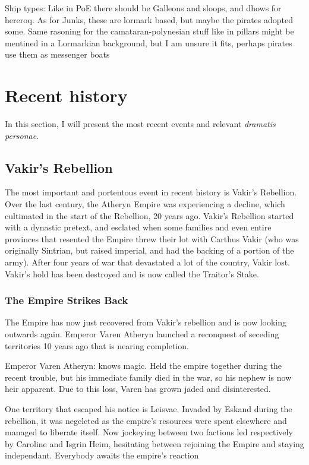 Ship types:
	Like in PoE there should be Galleons and sloops, and dhows for hereroq.
	As for Junks, these are lormark based, but maybe the pirates adopted some. Same rasoning for the camataran-polynesian stuff like in pillars might be mentined in a Lormarkian background, but I am unsure it fits, perhaps pirates use them as messenger boats


\section{Recent history}

\label{recent_history}

In this section, I will present the most recent events and relevant \textit{dramatis personae}.

\subsection{Vakir's Rebellion}

The most important and portentous event in recent history is Vakir's Rebellion. Over the last century, the Atheryn Empire was experiencing a decline, which cultimated in the start of the Rebellion, 20 years ago. Vakir's Rebellion started with a dynastic pretext, and esclated when some families and even entire provinces that resented the Empire threw their lot with Carthus Vakir (who was originally Sintrian, but raised imperial, and had the backing of a portion of the army). After four years of war that devastated a lot of the country, Vakir lost. Vakir's hold has been destroyed and is now called the Traitor's Stake.


\subsubsection{The Empire Strikes Back}

The Empire has now just recovered from Vakir's rebellion and is now looking outwards again. Emperor Varen Atheryn launched a reconquest of seceding territories 10 years ago that is nearing completion.

Emperor Varen Atheryn: knows magic. Held the empire together during the recent trouble, but his immediate family died in the war, so his nephew is now heir apparent. Due to this loss, Varen has grown jaded and disinterested.

One territory that escaped his notice is Leisvae. Invaded by Eskand during the rebellion, it was negelcted as the empire's resources were spent elsewhere and managed to liberate itself. Now jockeying between two factions led respectively by Caroline and Isgrin Heim, hesitating between rejoining the Empire and staying independant. Everybody awaits the empire's reaction

